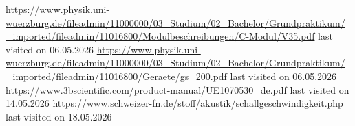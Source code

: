 \documentclass[a4paper,10pt,twocolumn]{scrartcl} %
\begin{document}


	














\begin{thebibliography}{}    %
	\url{https://www.physik.uni-wuerzburg.de/fileadmin/11000000/03_Studium/02_Bachelor/Grundpraktikum/_imported/fileadmin/11016800/Modulbeschreibungen/C-Modul/V35.pdf} last visited on 06.05.2026
	\url{https://www.physik.uni-wuerzburg.de/fileadmin/11000000/03_Studium/02_Bachelor/Grundpraktikum/_imported/fileadmin/11016800/Geraete/gs_200.pdf} last visited on 06.05.2026
	\url{https://www.3bscientific.com/product-manual/UE1070530_de.pdf} last visited on 14.05.2026
	\url{https://www.schweizer-fn.de/stoff/akustik/schallgeschwindigkeit.php} last visited on 18.05.2026
\end{thebibliography}
\end{document}
